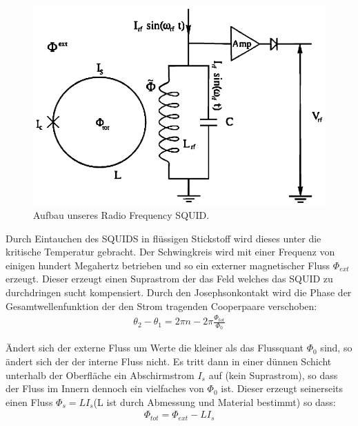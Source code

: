 \documentclass[12pt]{article}
\begin{document}
\begin{figure}[H]
\centering
\includegraphics[width=0.9\linewidth]{pictures/rfSQUID.eps}
\caption{Aufbau unseres Radio Frequency SQUID.}
\end{figure}

Durch Eintauchen des SQUIDS in flüssigen Stickstoff wird dieses unter die kritische Temperatur gebracht. Der Schwingkreis 
wird mit einer
 Frequenz von einigen hundert Megahertz betrieben und so ein externer magnetischer Fluss $\Phi_{ext}$ erzeugt. Dieser
 erzeugt einen Suprastrom der das Feld welches das SQUID zu durchdringen sucht kompensiert. Durch den Josephsonkontakt
 wird die Phase der Gesamtwellenfunktion der den Strom tragenden Cooperpaare verschoben:
\begin{align}
 \theta_2-\theta_1=2\pi n - 2 \pi \frac{\Phi_{tot}}{\Phi_0}
\end{align}

Ändert sich der externe Fluss um Werte die kleiner als das Flussquant $\Phi_0$ sind,  so ändert sich der der interne Fluss nicht. Es tritt dann in einer dünnen Schicht unterhalb der Oberfläche ein Abschirmstrom $I_s$ auf (kein Suprastrom), so
dass der Fluss im Innern dennoch ein vielfaches von  $\Phi_0$ ist. Dieser erzeugt seinerseits einen Fluss $\Phi_s=L I_s$(L ist durch Abmessung und Material bestimmt) so dass:
\begin{align}
 \Phi_{tot}=\Phi_{ext}-L I_s
\end{align}
\end{document}
